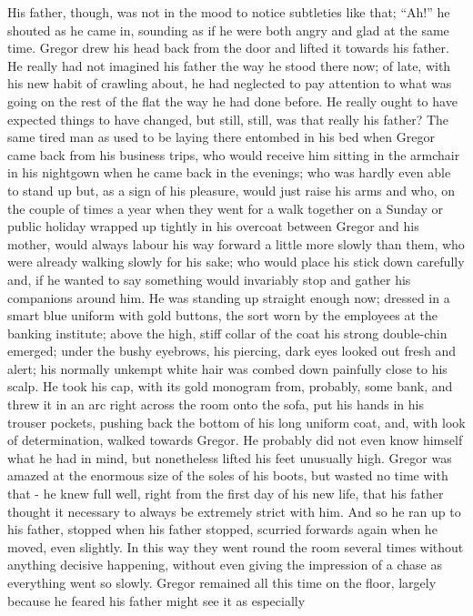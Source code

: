 \documentclass[12pt]{report}
\begin{document}
His father, though, was not in the mood to notice subtleties like that;
``Ah!'' he shouted as he came in, sounding as if he were both angry and
glad at the same time. Gregor drew his head back from the door and
lifted it towards his father. He really had not imagined his father the
way he stood there now; of late, with his new habit of crawling about,
he had neglected to pay attention to what was going on the rest of the
flat the way he had done before. He really ought to have expected things
to have changed, but still, still, was that really his father? The same
tired man as used to be laying there entombed in his bed when Gregor
came back from his business trips, who would receive him sitting in the
armchair in his nightgown when he came back in the evenings; who was
hardly even able to stand up but, as a sign of his pleasure, would just
raise his arms and who, on the couple of times a year when they went for
a walk together on a Sunday or public holiday wrapped up tightly in his
overcoat between Gregor and his mother, would always labour his way
forward a little more slowly than them, who were already walking slowly
for his sake; who would place his stick down carefully and, if he wanted
to say something would invariably stop and gather his companions around
him. He was standing up straight enough now; dressed in a smart blue
uniform with gold buttons, the sort worn by the employees at the banking
institute; above the high, stiff collar of the coat his strong
double-chin emerged; under the bushy eyebrows, his piercing, dark eyes
looked out fresh and alert; his normally unkempt white hair was combed
down painfully close to his scalp. He took his cap, with its gold
monogram from, probably, some bank, and threw it in an arc right across
the room onto the sofa, put his hands in his trouser pockets, pushing
back the bottom of his long uniform coat, and, with look of
determination, walked towards Gregor. He probably did not even know
himself what he had in mind, but nonetheless lifted his feet unusually
high. Gregor was amazed at the enormous size of the soles of his boots,
but wasted no time with that - he knew full well, right from the first
day of his new life, that his father thought it necessary to always be
extremely strict with him. And so he ran up to his father, stopped when
his father stopped, scurried forwards again when he moved, even
slightly. In this way they went round the room several times without
anything decisive happening, without even giving the impression of a
chase as everything went so slowly. Gregor remained all this time on the
floor, largely because he feared his father might see it as especially
\end{document}
